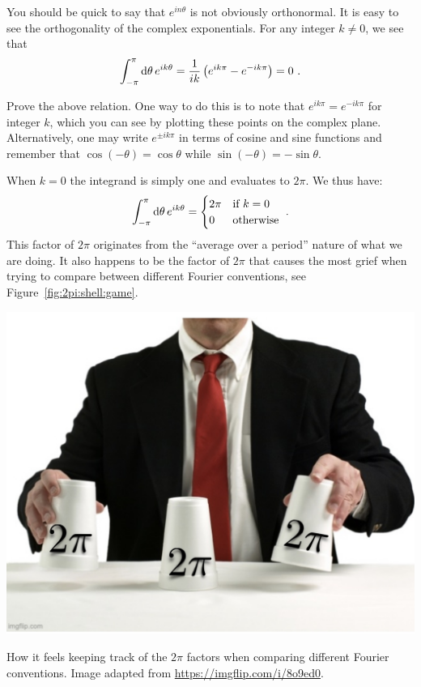 \documentclass[12pt, oneside]{report}    %
\begin{document}
You should be quick to say that $e^{in\theta}$ is not obviously orthonormal.
It is easy to see the orthogonality of the complex exponentials. For any integer $k\neq 0$, we see that
\begin{align}
    \int_{-\pi}^\pi \operatorname{d}\!{\theta} \, e^{ik\theta}
    = \frac{1}{ik}
    \left(e^{ik\pi} - e^{-ik\pi}\right) = 0 \ .
\end{align}
\begin{exercise}
Prove the above relation. One way to do this is to note that $e^{ik\pi} = e^{-ik\pi}$  for integer $k$, which you can see by plotting these points on the complex plane. Alternatively, one may write $e^{\pm i k\pi}$ in terms of cosine and sine functions and remember that $\cos(-\theta) = \cos \theta$ while $\sin(-\theta) = -\sin\theta$.
\end{exercise}
When $k=0$ the integrand is simply one and evaluates to $2\pi$. We thus have:
\begin{align}
    \int_{-\pi}^\pi \operatorname{d}\!{\theta} \, e^{ik\theta}
    = 
    \begin{cases}
    2\pi &\textnormal{if } k=0\\
    0 &\textnormal{otherwise}
    \end{cases}
    \ .
\end{align}
This factor of $2\pi$ originates from the ``average over a period'' nature of what we are doing. It also happens to be the factor of $2\pi$ that causes the most grief when trying to compare between different Fourier conventions, see Figure~\ref{fig:2pi:shell:game}.
\begin{marginfigure}%
    \includegraphics[width=\textwidth]{figures/2piShellGame.jpg}
    \caption{How it feels keeping track of the $2\pi$ factors when comparing different Fourier conventions. Image adapted from \url{https://imgflip.com/i/8o9ed0}.}
    \label{fig:2pi:shell:game}
\end{marginfigure}
\end{document}
